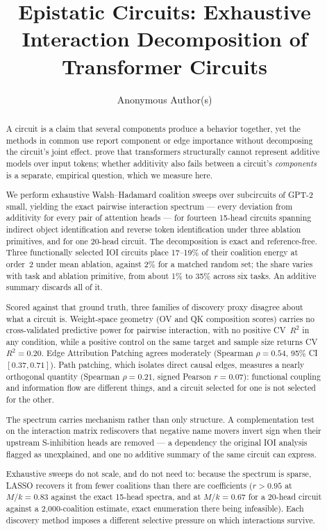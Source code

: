 \documentclass{article}
\title{Epistatic Circuits: Exhaustive Interaction Decomposition of Transformer Circuits}
\author{Anonymous Author(s)}
\begin{document}
\maketitle

\begin{abstract}
A circuit is a claim that several components produce a behavior together, yet the methods in common use report component or edge importance without decomposing the circuit's joint effect. \citet{leemann2024slalom} prove that
transformers structurally cannot represent additive models over input tokens; whether additivity
also fails between a circuit's \emph{components} is a separate, empirical question, which we measure here.

We perform exhaustive Walsh--Hadamard coalition sweeps over subcircuits of GPT-2 small, yielding the exact pairwise interaction spectrum --- every deviation from additivity for every pair of attention heads --- for fourteen 15-head circuits spanning indirect object
identification and reverse token identification under three ablation primitives, and for one
20-head circuit. The decomposition is exact and reference-free. Three functionally selected IOI circuits place 17--19\% of their coalition energy at order~2 under mean ablation, against 2\% for a matched random set; the share varies with task and ablation primitive, from about 1\% to 35\% across six tasks. An additive summary discards all of it.

Scored against that ground truth, three families of discovery proxy disagree about what a circuit
is. Weight-space geometry (OV and QK composition scores) carries no cross-validated predictive power for pairwise interaction, with no positive CV~$R^2$ in any condition, while a positive control on the same target and sample size returns CV~$R^2 = 0.20$. Edge Attribution Patching agrees moderately (Spearman $\rho = 0.54$, 95\% CI $[0.37, 0.71]$). Path patching, which isolates direct causal
edges, measures a nearly orthogonal quantity (Spearman $\rho = 0.21$, signed Pearson $r = 0.07$):
functional coupling and information flow are different things, and a circuit selected for one is
not selected for the other.

The spectrum carries mechanism rather than only structure. A complementation test on the
interaction matrix rediscovers that negative name movers invert sign when their upstream
S-inhibition heads are removed --- a dependency the original IOI analysis flagged as unexplained,
and one no additive summary of the same circuit can express.

Exhaustive sweeps do not scale, and do not need to: because the spectrum is sparse, LASSO recovers it
from fewer coalitions than there are coefficients ($r > 0.95$ at $M/k = 0.83$ against the exact 15-head spectra, and at $M/k = 0.67$ for a 20-head circuit against a 2{,}000-coalition estimate, exact enumeration there being infeasible). Each discovery method imposes a different selective pressure on which interactions survive.
\end{abstract}
\end{document}
